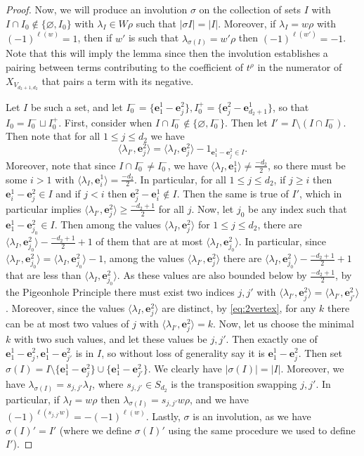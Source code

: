 \documentclass[12pt]{article}
\renewcommand{\b}[1]{\textbf{#1}}
\theoremstyle{definition}
\theoremstyle{remark}
\begin{document}
\begin{proof}
    Now, we will produce an involution $\sigma$ on the collection of sets $I$ with $I\cap I_0\not\in\{\varnothing,I_0\}$ with $\lambda_I\in W\rho$ such that $|\sigma I|=|I|$. Moreover, if $\lambda_I=w\rho$ with $(-1)^{\ell(w)}=1$, then if $w'$ is such that $\lambda_{\sigma(I)}=w'\rho$ then $(-1)^{\ell(w')}=-1$. Note that this will imply the lemma since then the involution establishes a pairing between terms contributing to the coefficient of $t^\rho$ in the numerator of $X_{V_{d_2+1,d_2}}$ that pairs a term with its negative. 

    Let $I$ be such a set, and let $I_0^-=\{\b{e}_1^1-\b{e}_j^2\},I_0^+=\{\b{e}_j^2-\b{e}_{d_2+1}^1\}$, so that $I_0=I_0^-\sqcup I_0^+$. First, consider when $I\cap I_0^-\not\in\{\varnothing,I_0^-\}$. Then let $I'=I\setminus (I\cap I_0^-)$. Then note that for all $1\leq j\leq d_2$ we have
    \begin{equation}
        \langle\lambda_{I'},\b{e}_j^2\rangle=\langle\lambda_I,\b{e}_j^2\rangle-1_{\b{e}_1^1-\b{e}_j^2\in I}.\label{eq:2vertex}
    \end{equation}
    Moreover, note that since $I\cap I_0^-\neq I_0^-$, we have $\langle\lambda_I,\b{e}_1^1\rangle\neq\frac{-d_2}{2}$, so there must be some $i>1$ with $\langle\lambda_I,\b{e}_i^1\rangle=\frac{-d_2}{2}$. In particular, for all $1\leq j\leq d_2$, if $j\geq i$ then $\b{e}_i^1-\b{e}_j^2\in I$ and if $j<i$ then $\b{e}_j^2-\b{e}_i^1\not\in I$. Then the same is true of $I'$, which in particular implies $\langle\lambda_{I'},\b{e}_j^2\rangle\geq\frac{-d_2+1}{2}$ for all $j$. Now, let $j_0$ be any index such that $\b{e}_1^1-\b{e}_{j_0}^2\in I$. Then among the values $\langle\lambda_I,\b{e}_j^2\rangle$ for $1\leq j\leq d_2$, there are $\langle\lambda_I,\b{e}_{j_0}^2\rangle-\frac{-d_2+1}{2}+1$ of them that are at most $\langle\lambda_I,\b{e}_{j_0}^2\rangle$. In particular, since $\langle\lambda_{I'},\b{e}_{j_0}^2\rangle=\langle\lambda_I,\b{e}_{j_0}^2\rangle-1$, among the values $\langle\lambda_{I'},\b{e}_j^2\rangle$ there are $\langle\lambda_I,\b{e}_{j_0}^2\rangle-\frac{-d_2+1}{2}+1$ that are less than $\langle\lambda_I,\b{e}_{j_0}^2\rangle$. As these values are also bounded below by $\frac{-d_2+1}{2}$, by the Pigeonhole Principle there must exist two indices $j,j'$ with $\langle\lambda_{I'},\b{e}_j^2\rangle=\langle\lambda_{I'},\b{e}_{j'}^2\rangle$. Moreover, since the values $\langle\lambda_I,\b{e}_j^2\rangle$ are distinct, by \eqref{eq:2vertex}, for any $k$ there can be at most two values of $j$ with $\langle\lambda_{I'},\b{e}_j^2\rangle=k$. Now, let us choose the minimal $k$ with two such values, and let these values be $j,j'$. Then exactly one of $\b{e}_1^1-\b{e}_j^2,\b{e}_1^1-\b{e}_{j'}^2$ is in $I$, so without loss of generality say it is $\b{e}_1^1-\b{e}_j^2$. Then set $\sigma(I)=I\setminus\{\b{e}_1^1-\b{e}_j^2\}\cup\{\b{e}_1^1-\b{e}_{j'}^2\}$. We clearly have $|\sigma(I)|=|I|$. Moreover, we have $\lambda_{\sigma(I)}=s_{j,j'}\lambda_I$, where $s_{j,j'}\in S_{d_2}$ is the transposition swapping $j,j'$. In particular, if $\lambda_I=w\rho$ then $\lambda_{\sigma(I)}=s_{j,j'}w\rho$, and we have $(-1)^{\ell(s_{j,j'}w)}=-(-1)^{\ell(w)}$. Lastly, $\sigma$ is an involution, as we have $\sigma(I)'=I'$ (where we define $\sigma(I)'$ using the same procedure we used to define $I'$).


\end{proof}
\end{document}
